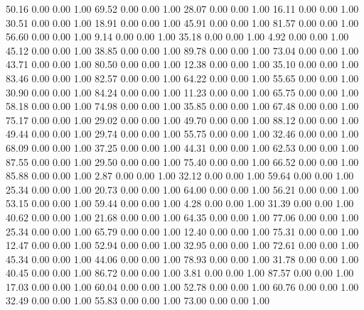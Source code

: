    50.16   0.00   0.00   1.00
   69.52   0.00   0.00   1.00
   28.07   0.00   0.00   1.00
   16.11   0.00   0.00   1.00
   30.51   0.00   0.00   1.00
   18.91   0.00   0.00   1.00
   45.91   0.00   0.00   1.00
   81.57   0.00   0.00   1.00
   56.60   0.00   0.00   1.00
    9.14   0.00   0.00   1.00
   35.18   0.00   0.00   1.00
    4.92   0.00   0.00   1.00
   45.12   0.00   0.00   1.00
   38.85   0.00   0.00   1.00
   89.78   0.00   0.00   1.00
   73.04   0.00   0.00   1.00
   43.71   0.00   0.00   1.00
   80.50   0.00   0.00   1.00
   12.38   0.00   0.00   1.00
   35.10   0.00   0.00   1.00
   83.46   0.00   0.00   1.00
   82.57   0.00   0.00   1.00
   64.22   0.00   0.00   1.00
   55.65   0.00   0.00   1.00
   30.90   0.00   0.00   1.00
   84.24   0.00   0.00   1.00
   11.23   0.00   0.00   1.00
   65.75   0.00   0.00   1.00
   58.18   0.00   0.00   1.00
   74.98   0.00   0.00   1.00
   35.85   0.00   0.00   1.00
   67.48   0.00   0.00   1.00
   75.17   0.00   0.00   1.00
   29.02   0.00   0.00   1.00
   49.70   0.00   0.00   1.00
   88.12   0.00   0.00   1.00
   49.44   0.00   0.00   1.00
   29.74   0.00   0.00   1.00
   55.75   0.00   0.00   1.00
   32.46   0.00   0.00   1.00
   68.09   0.00   0.00   1.00
   37.25   0.00   0.00   1.00
   44.31   0.00   0.00   1.00
   62.53   0.00   0.00   1.00
   87.55   0.00   0.00   1.00
   29.50   0.00   0.00   1.00
   75.40   0.00   0.00   1.00
   66.52   0.00   0.00   1.00
   85.88   0.00   0.00   1.00
    2.87   0.00   0.00   1.00
   32.12   0.00   0.00   1.00
   59.64   0.00   0.00   1.00
   25.34   0.00   0.00   1.00
   20.73   0.00   0.00   1.00
   64.00   0.00   0.00   1.00
   56.21   0.00   0.00   1.00
   53.15   0.00   0.00   1.00
   59.44   0.00   0.00   1.00
    4.28   0.00   0.00   1.00
   31.39   0.00   0.00   1.00
   40.62   0.00   0.00   1.00
   21.68   0.00   0.00   1.00
   64.35   0.00   0.00   1.00
   77.06   0.00   0.00   1.00
   25.34   0.00   0.00   1.00
   65.79   0.00   0.00   1.00
   12.40   0.00   0.00   1.00
   75.31   0.00   0.00   1.00
   12.47   0.00   0.00   1.00
   52.94   0.00   0.00   1.00
   32.95   0.00   0.00   1.00
   72.61   0.00   0.00   1.00
   45.34   0.00   0.00   1.00
   44.06   0.00   0.00   1.00
   78.93   0.00   0.00   1.00
   31.78   0.00   0.00   1.00
   40.45   0.00   0.00   1.00
   86.72   0.00   0.00   1.00
    3.81   0.00   0.00   1.00
   87.57   0.00   0.00   1.00
   17.03   0.00   0.00   1.00
   60.04   0.00   0.00   1.00
   52.78   0.00   0.00   1.00
   60.76   0.00   0.00   1.00
   32.49   0.00   0.00   1.00
   55.83   0.00   0.00   1.00
   73.00   0.00   0.00   1.00
